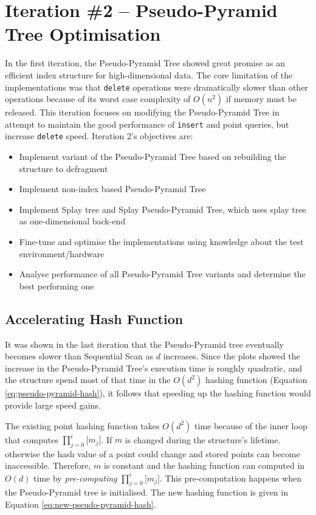 \section{Iteration \#2 -- Pseudo-Pyramid Tree Optimisation}

In the first iteration, the Pseudo-Pyramid Tree showed great promise as an efficient index structure for high-dimensional data. The core limitation of the implementations was that \texttt{delete} operations were dramatically slower than other operations because of its worst case complexity of $O(n^2)$ if memory must be released. This iteration focuses on modifying the Pseudo-Pyramid Tree in attempt to maintain the good performance of \texttt{insert} and point queries, but increase \texttt{delete} speed. Iteration 2's objectives are:
\begin{itemize}
	\item Implement variant of the Pseudo-Pyramid Tree based on rebuilding the structure to defragment
	\item Implement non-index based Pseudo-Pyramid Tree
	\item Implement Splay tree and Splay Pseudo-Pyramid Tree, which uses splay tree as one-dimensional back-end
	\item Fine-tune and optimise the implementations using knowledge about the test environment/hardware
	\item Analyse performance of all Pseudo-Pyramid Tree variants and determine the best performing one
\end{itemize}

\subsection{Accelerating Hash Function}

It was shown in the last iteration that the Pseudo-Pyramid tree eventually becomes slower than Sequential Scan as $d$ increases. Since the plots showed the increase in the Pseudo-Pyramid Tree's execution time is roughly quadratic, and the structure spend most of that time in the $O(d^2)$ hashing function (Equation \ref{eq:pseudo-pyramid-hash}), it follows that speeding up the hashing function would provide large speed gains.

The existing point hashing function takes $O(d^2)$ time because of the inner loop that computes $\prod_{j=0}^{i}{\lbrack m_j \rbrack}$. If $m$ is changed during the structure's lifetime. otherwise the hash value of a point could change and stored points can become inaccessible. Therefore, $m$ is constant and the hashing function can computed in $O(d)$ time by \textit{pre-computing} $\prod_{j=0}^{i}{\lbrack m_j \rbrack}$. This pre-computation happens when the Pseudo-Pyramid tree is initialised. The new hashing function is given in Equation \ref{eq:new-pseudo-pyramid-hash}.

